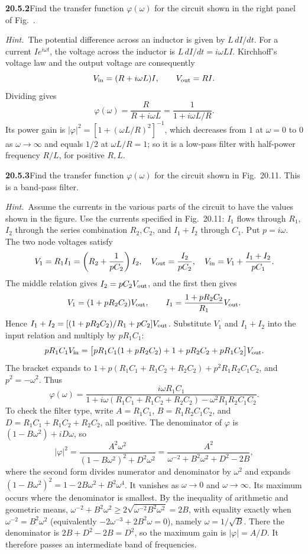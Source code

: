 \par\bigskip
\noindent\textbf{20.5.2}\quad Find the transfer function
$\varphi(\omega)$ for the circuit shown in the right panel of
Fig.~.
\par\emph{Hint.}~The potential difference across an inductor is
given by $L\,dI/dt$.
\solution
{}
For a current $I e^{i\omega t}$, the voltage across the
inductor is $L\,dI/dt=i\omega LI$. Kirchhoff's voltage law and
the output voltage are consequently
\[
V_{\rm in}=(R+i\omega L)I,\qquad V_{\rm out}=RI.
\]
Dividing gives
\[
\boxed{\varphi(\omega)=\frac{R}{R+i\omega L}
=\frac1{1+i\omega L/R}}.
\]
Its power gain is $|\varphi|^2=[1+(\omega L/R)^2]^{-1}$, which
decreases from $1$ at $\omega=0$ to $0$ as $\omega\to\infty$ and
equals $1/2$ at $\omega L/R=1$; so it is a
low-pass filter with half-power frequency $R/L$, for positive
$R,L$.

\par\bigskip
\noindent\textbf{20.5.3}\quad Find the transfer function
$\varphi(\omega)$ for the circuit shown in Fig.~20.11. This is a
band-pass filter.
\par\emph{Hint.}~Assume the currents in the various parts of the
circuit to have the values shown in the figure.
\solution
Use the currents specified in Fig.~20.11: $I_1$ flows
through $R_1$, $I_2$ through the series combination $R_2,C_2$,
and $I_1+I_2$ through $C_1$. Put $p=i\omega$. The two node
voltages satisfy
\[
V_1=R_1I_1=\left(R_2+\frac1{pC_2}\right)I_2,
\quad V_{\rm out}=\frac{I_2}{pC_2},
\quad V_{\rm in}=V_1+\frac{I_1+I_2}{pC_1}.
\]
The middle relation gives $I_2=pC_2V_{\rm out}$, and the
first then gives
\[
V_1=(1+pR_2C_2)V_{\rm out},\qquad
I_1=\frac{1+pR_2C_2}{R_1}V_{\rm out}.
\]
Hence
$I_1+I_2=[(1+pR_2C_2)/R_1+pC_2]V_{\rm out}$. Substitute $V_1$
and $I_1+I_2$ into the input relation and multiply
by $pR_1C_1$:
\[
pR_1C_1V_{\rm in}
=\big[pR_1C_1(1+pR_2C_2)+1+pR_2C_2+pR_1C_2\big]V_{\rm out}.
\]
The bracket expands to
$1+p(R_1C_1+R_1C_2+R_2C_2)+p^2R_1R_2C_1C_2$, and
$p^2=-\omega^2$. Thus
\[
\boxed{\varphi(\omega)=
\frac{i\omega R_1C_1}
{1+i\omega(R_1C_1+R_1C_2+R_2C_2)-\omega^2R_1R_2C_1C_2}}.
\]
To check the filter type, write $A=R_1C_1$,
$B=R_1R_2C_1C_2$, and $D=R_1C_1+R_1C_2+R_2C_2$, all
positive. The denominator of $\varphi$ is $(1-B\omega^2)+iD\omega$,
so
\[
|\varphi|^2=\frac{A^2\omega^2}{(1-B\omega^2)^2+D^2\omega^2}
=\frac{A^2}{\omega^{-2}+B^2\omega^2+D^2-2B},
\]
where the second form divides numerator and denominator by
$\omega^2$ and expands $(1-B\omega^2)^2=1-2B\omega^2+B^2\omega^4$.
It vanishes as $\omega\to0$ and $\omega\to\infty$. Its
maximum occurs where the denominator is smallest. By the
inequality of arithmetic and geometric means,
$\omega^{-2}+B^2\omega^2\ge2\sqrt{\omega^{-2}B^2\omega^2}=2B$,
with equality exactly when $\omega^{-2}=B^2\omega^2$ (equivalently
$-2\omega^{-3}+2B^2\omega=0$), namely
$\omega=1/\sqrt B$. There the denominator is
$2B+D^2-2B=D^2$, so the maximum gain is $|\varphi|=A/D$.
It therefore passes an intermediate band of frequencies.

